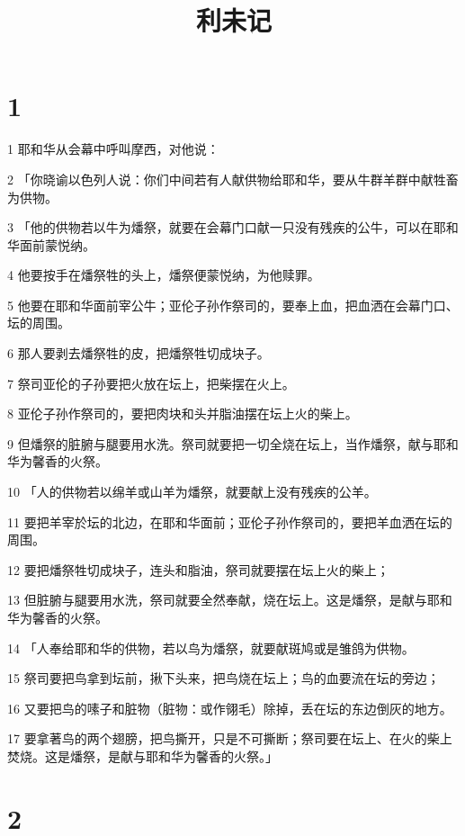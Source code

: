 

\title{利未记}


\chapter{1}

\par 1 耶和华从会幕中呼叫摩西，对他说：
\par 2 「你晓谕以色列人说：你们中间若有人献供物给耶和华，要从牛群羊群中献牲畜为供物。
\par 3 「他的供物若以牛为燔祭，就要在会幕门口献一只没有残疾的公牛，可以在耶和华面前蒙悦纳。
\par 4 他要按手在燔祭牲的头上，燔祭便蒙悦纳，为他赎罪。
\par 5 他要在耶和华面前宰公牛；亚伦子孙作祭司的，要奉上血，把血洒在会幕门口、坛的周围。
\par 6 那人要剥去燔祭牲的皮，把燔祭牲切成块子。
\par 7 祭司亚伦的子孙要把火放在坛上，把柴摆在火上。
\par 8 亚伦子孙作祭司的，要把肉块和头并脂油摆在坛上火的柴上。
\par 9 但燔祭的脏腑与腿要用水洗。祭司就要把一切全烧在坛上，当作燔祭，献与耶和华为馨香的火祭。
\par 10 「人的供物若以绵羊或山羊为燔祭，就要献上没有残疾的公羊。
\par 11 要把羊宰於坛的北边，在耶和华面前；亚伦子孙作祭司的，要把羊血洒在坛的周围。
\par 12 要把燔祭牲切成块子，连头和脂油，祭司就要摆在坛上火的柴上；
\par 13 但脏腑与腿要用水洗，祭司就要全然奉献，烧在坛上。这是燔祭，是献与耶和华为馨香的火祭。
\par 14 「人奉给耶和华的供物，若以鸟为燔祭，就要献斑鸠或是雏鸽为供物。
\par 15 祭司要把鸟拿到坛前，揪下头来，把鸟烧在坛上；鸟的血要流在坛的旁边；
\par 16 又要把鸟的嗉子和脏物（脏物：或作翎毛）除掉，丢在坛的东边倒灰的地方。
\par 17 要拿著鸟的两个翅膀，把鸟撕开，只是不可撕断；祭司要在坛上、在火的柴上焚烧。这是燔祭，是献与耶和华为馨香的火祭。」

\chapter{2}

